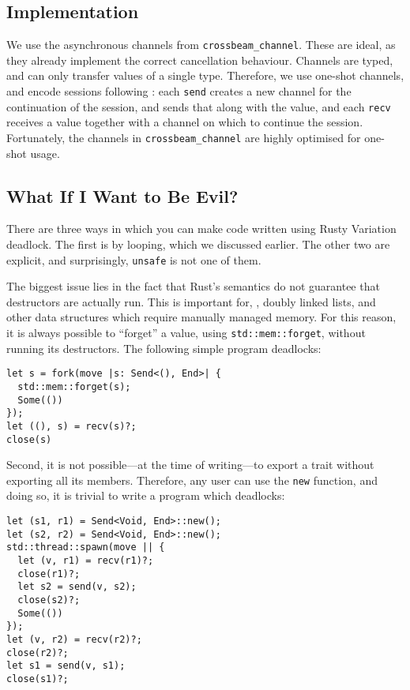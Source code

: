 \documentclass[sigconf,natbib=false]{acmart}
\begin{document}
\subsection{Implementation}
We use the asynchronous channels from \lstinline{crossbeam_channel}. These are ideal, as they already implement the correct cancellation behaviour. Channels are typed, and can only transfer values of a single type. Therefore, we use one-shot channels, and encode sessions following \textcite{tart2017,scalas2016,padovani2017}: each \lstinline{send} creates a new channel for the continuation of the session, and sends that along with the value, and each \lstinline{recv} receives a value together with a channel on which to continue the session. Fortunately, the channels in \lstinline{crossbeam_channel} are highly optimised for one-shot usage.

\subsection{What If I Want to Be Evil?}\label{sec:limitations}
There are three ways in which you can make code written using Rusty Variation deadlock. The first is by looping, which we discussed earlier. The other two are explicit, and surprisingly, \lstinline{unsafe} is not one of them.

The biggest issue lies in the fact that Rust's semantics do not guarantee that destructors are actually run. This is important for, \eg, doubly linked lists, and other data structures which require manually managed memory. For this reason, it is always possible to ``forget'' a value, using \lstinline{std::mem::forget}, without running its destructors. The following simple program deadlocks:
\begin{lstlisting}
let s = fork(move |s: Send<(), End>| {
  std::mem::forget(s);
  Some(())
});
let ((), s) = recv(s)?;
close(s)
\end{lstlisting}
Second, it is not possible---at the time of writing---to export a trait without exporting all its members. Therefore, any user can use the \lstinline{new} function, and doing so, it is trivial to write a program which deadlocks: 
\begin{lstlisting}
let (s1, r1) = Send<Void, End>::new();
let (s2, r2) = Send<Void, End>::new();
std::thread::spawn(move || {
  let (v, r1) = recv(r1)?;
  close(r1)?;
  let s2 = send(v, s2);
  close(s2)?;
  Some(())
});
let (v, r2) = recv(r2)?;
close(r2)?;
let s1 = send(v, s1);
close(s1)?;
\end{lstlisting}
\end{document}
